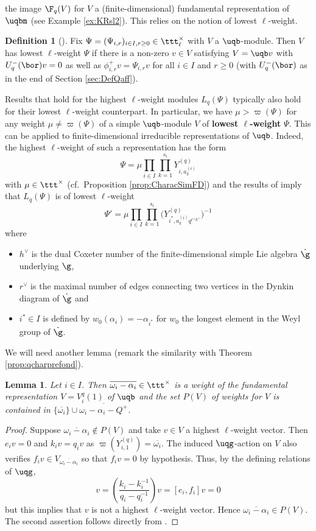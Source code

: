 \documentclass[11pt]{amsart}
\newtheorem{lem}[theorem]{Lemma}
\theoremstyle{definition}
\newtheorem{defn}[theorem]{Definition}
\theoremstyle{remark}
\numberwithin{equation}{section}
\begin{document}
 the image $\F_q(V)$ for $V$ a (finite-dimensional)
 fundamental representation of $\uqbm$ (see Example \ref{ex:KRsl2}). This relies on the notion of lowest $\ell$-weight.
\begin{defn}[{\cite[Section 3.6]{hj}}] Fix $\Psi = (\Psi_{i,r})_{i\in I,r\geq 0}\in \ttt^{\times}_{\ell}$ with $V$ a $\uqb$-module. Then $V$ has lowest $\ell$-weight $\Psi$ if there is a non-zero $v \in V$ satisfying $V = \uqb v$ with $U_q^-(\bor)v = 0$ as well as $\phi_{i,r}^+ v = \Psi_{i,r}v$ for all $i \in I$ and $r \geq 0$ (with $U_q^-(\bor)$ as in the end of Section \ref{sec:DefQaff}). 
\end{defn}
Results that hold for the highest $\ell$-weight modules $L_q(\Psi)$ typically also hold for their lowest $\ell$-weight counterpart. In particular, we have $\mu > \varpi(\Psi)$ for any weight $\mu\neq \varpi(\Psi)$ of a simple $\uqb$-module $V$ of \textbf{lowest $\ell$-weight} $\Psi$. This can be applied to finite-dimensional irreducible representations of $\uqb$. Indeed, the highest $\ell$-weight of such a representation has the form $$\Psi = {\textstyle \mu\prod_{i\in I}\prod_{k=1}^{s_i} Y^{(q)}_{i,a_k^{(i)}}}$$ with $\mu \in \ttt^{\times}$ (cf.~Proposition \ref{prop:CharacSimFD}) and the results of \cite{fm} imply that $L_q(\Psi)$ is of lowest $\ell$-weight
$$ \textstyle \Psi'=\mu\prod_{i\in I}\prod_{k=1}^{s_i} \Big(Y^{(q)}_{i^*,a_k^{(i)}q^{r^{\vee}h^{\vee}}}\Big)^{-1} $$
where 
\begin{itemize}[leftmargin = 4.2mm]
\item[--] $h^{\vee}$ is the dual Coxeter number of the finite-dimensional simple 
Lie algebra $\dot{\g}$ underlying $\g$,
\item[--] $r^{\vee}$ is the maximal number of edges connecting two vertices in the Dynkin diagram of $\dot{\g}$ and 
\item[--] $i^*\in I$ is defined by $w_0(\alpha_i)=-\alpha_{i^*}$ for $w_0$ the longest element in the Weyl group of $\dot{\g}$.
\end{itemize}
We will need another lemma (remark the similarity with Theorem \ref{prop:qcharprefond}). 
\begin{lem}\label{lem:weightsFond} Let $i\in I$. Then $\overline{\omega_i-\alpha_i}\in \ttt^{\times}$ is a weight of the fundamental representation $V=V_{i}^q(1)$ of $\uqb$ and the set $P(V)$ of weights for $V$ is contained in $\{\overline{\omega_i}\}\cup\overline{\omega_i-\alpha_i-Q^+}$.
\end{lem}
\begin{proof}
Suppose $\overline{\omega_i-\alpha_i}\not\in P(V)$ and take $v\in V$ a highest $\ell$-weight vector. Then $e_iv=0$ and $k_iv = q_iv$ as $\varpi(Y_{i,1}^{(q)}) = \overline{\omega_i}$. The induced $\uqg$-action on $V$ also verifies $f_i v \in V_{\overline{\omega_i-\alpha_i}}$ so that $f_iv = 0$ by hypothesis. Thus, by the defining relations of $\uqg$,
$$ \textstyle v = \left(\frac{k_i-k_i^{-1}}{q_i-q_i^{-1}}\right)v = [e_i,f_i]v = 0$$
but this implies that $v$ is not a highest $\ell$-weight vector. Hence $\overline{\omega_i-\alpha_i}\in P(V)$. The second assertion follows directly from \cite[Corollary 2.13]{h3}. 
\end{proof}
\end{document}

